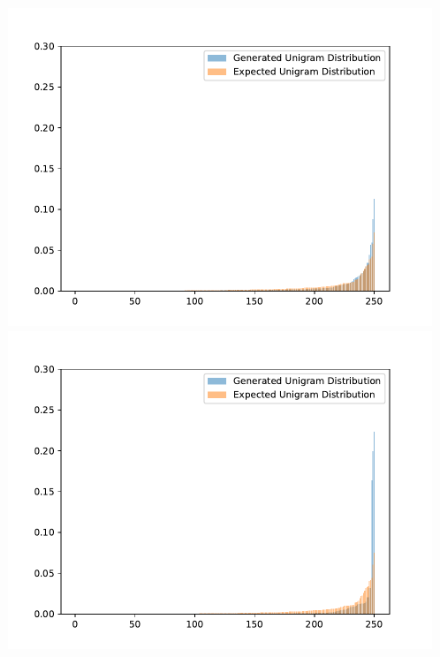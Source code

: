 \begin{figure}[H]
  \centering
  \small
  \endminipage\hfill
  \includegraphics[width=\linewidth]{img/plots/opensubtitles_not_reversed/unigram_distribution_comparison_step_1500000.pdf}
  \centering
  \small
  \endminipage\hfill
  \includegraphics[width=\linewidth]{img/plots/opensubtitles_not_reversed/unigram_distribution_comparison_step_2000000.pdf}
  \centering
  \small
  \endminipage\hfill

\end{figure}
